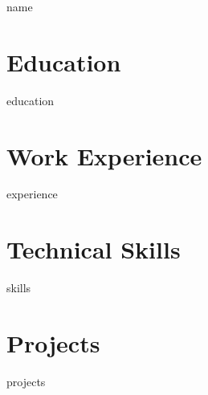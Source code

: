 \documentclass[letterpaper,11pt]{article}
\begin{document}
\begin{center}
    {\huge {{ name }}} \\ \vspace{2pt} 
    \href{mailto:{{ email }}}{}
\end{center}

\section{Education}
{{ education }}

\section{Work Experience}
{{ experience }}

\section{Technical Skills}
{{ skills }}

\section{Projects}
{{ projects }}
\end{document}
